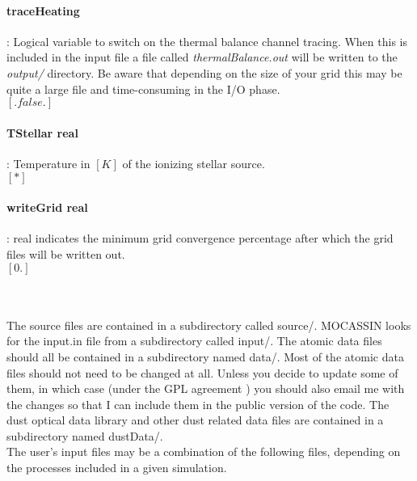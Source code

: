 \documentclass[11pt]{article}
\begin{document}
\paragraph { traceHeating} : Logical variable to switch on the thermal balance channel tracing. When this is included in the input file a file called {\it thermalBalance.out} will be written to the {\it output/} directory. Be aware that depending on the size of your grid this may be quite a large file and time-consuming in the I/O phase.\\
$[.false.]$\\ 


\paragraph  {  TStellar real  }  : Temperature in $[K]$ of the ionizing stellar source.\\
		     $[*]$\\

\paragraph  {  writeGrid real  } : real indicates the minimum grid convergence percentage
                     after which the grid files will be written out. \\
		     $[0.]$\\

\pagebreak

\\

\\

    The source files are contained in a subdirectory called source/.
    MOCASSIN looks for the input.in file from a subdirectory called input/. 
    The atomic data files should all be contained in a subdirectory named data/. 
    Most of the atomic data files should not need 
    to be changed at all. Unless you decide to update some of them, in which case 
    (under the GPL agreement ) you should also email me with the changes so that 
    I can include them in the public version of the code. 
    The dust optical data library and other dust related data files are contained 
    in a subdirectory named dustData/.\\

    The user's input files may be a combination of the following files, 
    depending on the processes included in a given simulation.\\
\end{document}
